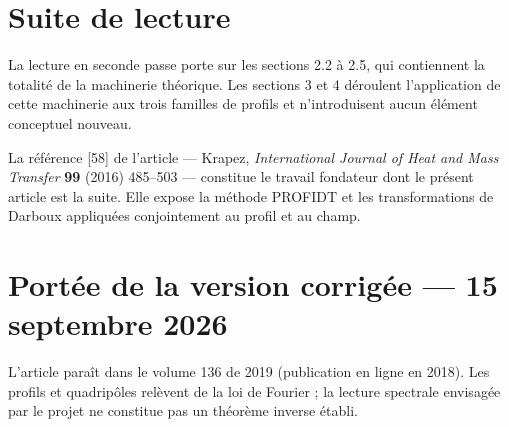 \documentclass[11pt,a4paper]{article}
\begin{document}
\section{Suite de lecture}

La lecture en seconde passe porte sur les sections 2.2 à 2.5, qui contiennent la totalité de la
machinerie théorique. Les sections 3 et 4 déroulent l'application de cette machinerie aux trois
familles de profils et n'introduisent aucun élément conceptuel nouveau.

La référence [58] de l'article --- Krapez, \emph{International Journal of Heat and Mass Transfer}
\textbf{99} (2016) 485--503 --- constitue le travail fondateur dont le présent article est la suite.
Elle expose la méthode PROFIDT et les transformations de Darboux appliquées conjointement au profil et
au champ.
\section*{Portée de la version corrigée --- 15 septembre 2026}
L'article paraît dans le volume 136 de 2019 (publication en ligne en 2018). Les profils et quadripôles relèvent de la loi de Fourier ; la lecture spectrale envisagée par le projet ne constitue pas un théorème inverse établi.
\end{document}
